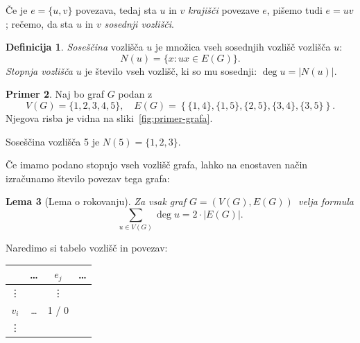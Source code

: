 \documentclass[12pt,a4paper]{amsart}
\theoremstyle{definition} %
\newtheorem{definicija}{Definicija}[section]
\newtheorem{primer}[definicija]{Primer}
\theoremstyle{plain} %
\newtheorem{lema}[definicija]{Lema}
\newcommand{\graf}[1][G]{\ensuremath{#1 = (V(#1), E(#1))}}
\newcommand{\vozlisca}[1][G]{\ensuremath{V(#1)}}
\newcommand{\povezave}[1][G]{\ensuremath{E(#1)}}
\DeclareMathOperator {\stopnja} {deg}
\begin{document}
Če je $e = \{ u,v \}$ povezava, tedaj sta $u$ in $v$ \emph{krajišči} povezave $e$, pišemo tudi $e = uv$; rečemo, da sta $u$ in $v$ \emph{sosednji vozlišči}.

\begin{definicija}
	\emph{Soseščina} vozlišča $u$ je množica vseh sosednjih vozlišč vozlišča $u$:
	\[ N(u) = \{ x\colon ux \in \povezave \} .\]
	\emph{Stopnja vozlišča} $u$ je število vseh vozlišč, ki so mu sosednji: $\stopnja u = |N(u)|$.
\end{definicija}

\begin{primer}
    \label{primer:sosedi}
    Naj bo graf $G$ podan z \[\vozlisca = \{ 1,2,3,4,5 \}, \quad \povezave = \left\{ \{1,4\},\{1,5\},\{2,5\},\{3,4\},\{3,5\} \right\}.\]
    Njegova risba je vidna na sliki~\ref{fig:primer-grafa}.
    \begin{center}
        \bigskip
        \label{fig:primer-grafa}
        \bigskip
    \end{center}
    Soseščina vozlišča 5 je $N(5) = \{1,2,3\}$.
\end{primer}
\medskip

Če imamo podano stopnjo vseh vozlišč grafa, lahko na enostaven način izračunamo število povezav tega grafa:

\begin{lema}[Lema o rokovanju]
    \label{lema:rokovanje}
    Za vsak graf \graf~velja formula
    \begin{equation}
        \sum_{u \in V(G)}\! \stopnja u = 2 \cdot |E(G)|.
        \label{eq:lema-o-rokovanju}
    \end{equation}
\end{lema}

\proof
    Naredimo si tabelo vozlišč in povezav:
    
    \begin{table}[h]
        \centering
        \begin{tabular}{c|ccc}
            & \ldots & $e_j$ & \ldots \\ \hline
            \vdots & & \vdots & \\
            $v_i$ & \ldots & 1 / 0 & \\
            \vdots & & &
        \end{tabular}
    \end{table}
    
\end{document}

